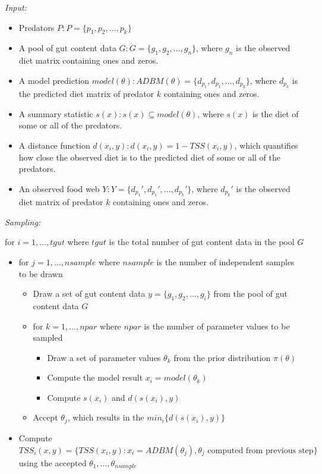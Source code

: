 \documentclass{article}
\begin{document}
\emph{Input:}

\begin{itemize}
\item
  Predators \(P: P = \{p_1, p_2, \dots, p_k \}\)
\item
  A pool of gut content data \(G: G = \{g_1, g_2, \dots, g_n\}\), where
  \(g_{n}\) is the observed diet matrix containing ones and zeros.
\item
  A model prediction
  \(model(\theta): ADBM(\theta) = \{d_{p_1}, d_{p_1}, \dots, d_{p_k}\}\),
  where \(d_{p_k}\) is the predicted diet matrix of predator \(k\)
  containing ones and zeros.
\item
  A summary statistic \(s(x): s(x) \subseteq model(\theta)\), where
  \(s(x)\) is the diet of some or all of the predators.
\item
  A distance function \(d(x_i, y) : d(x_i,y) = 1 - TSS(x_i, y)\), which
  quantifies how close the observed diet is to the predicted diet of
  some or all of the predators.
\item
  An observed food web
  \(Y: Y = \{d_{p_1}', d_{p_1}', \dots, d_{p_k}'\}\), where \(d_{p_k}'\)
  is the observed diet matrix of predator \(k\) containing ones and
  zeros.
\end{itemize}

\emph{Sampling:}

for \(i = 1, \dots, tgut\) where \(tgut\) is the total number of gut
content data in the pool \(G\)

\begin{itemize}
\item
  for \(j = 1, \dots, nsample\) where \(nsample\) is the number of
  independent samples to be drawn

  \begin{itemize}
  \item
    Draw a set of gut content data \(y = \{g_1, g_2, \dots, g_i\}\) from
    the pool of gut content data \(G\)
  \item
    for \(k = 1, \dots, npar\) where \(npar\) is the number of parameter
    values to be sampled

    \begin{itemize}
    \item
      Draw a set of parameter values \(\theta_k\) from the prior
      distribution \(\pi(\theta)\)
    \item
      Compute the model result \(x_i = model(\theta_k)\)
    \item
      Compute \(s(x_i)\) and \(d(s(x_i), y)\)
    \end{itemize}
  \item
    Accept \(\theta_j\), which results in the \(min_i\{d(s(x_i), y)\}\)
  \end{itemize}
\item
  Compute
  \(TSS_{i}(x, y) = \{TSS(x_i,y): x_i = ADBM(\theta_j), \theta_j \text{ computed from previous step}\}\)
  using the accepted \(\theta_1, \dots, \theta_{nsample}\)
\end{itemize}
\end{document}

